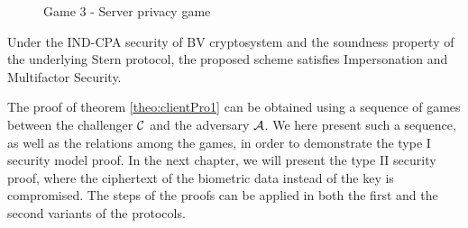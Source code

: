\begin{figure}[htbp!] 
  \centering
  \caption{Game 3 - Server privacy game}
  \label{fig:game3protocol1server}
\end{figure}

\begin{theorem}
  \label{theo:clientPro1}
  Under the IND-CPA security of BV cryptosystem and the soundness property of
  the underlying Stern protocol, the proposed scheme satisfies Impersonation and
  Multifactor Security.
\end{theorem}

The proof of theorem \ref{theo:clientPro1} can be obtained using a sequence of games
between the challenger $\mathcal{C}$ and the adversary $\mathcal{A}$. We here
present such a sequence, as well as the relations among the games, in order to
demonstrate the type I security model proof. In
the next chapter, we will present the type II
security proof, where the ciphertext of the biometric data instead of the key is compromised. The steps of the proofs can be applied in both the first
and the second variants of the protocols.


